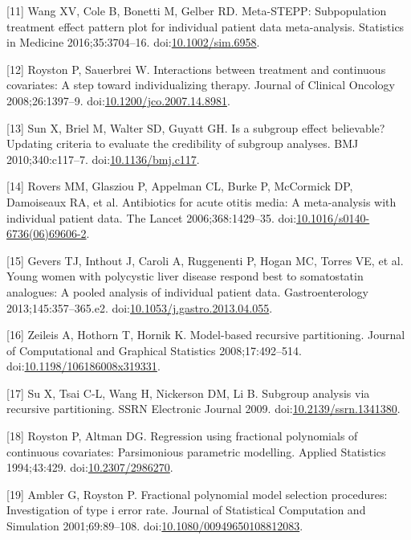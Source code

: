 \documentclass[14pt,]{article}
\begin{document}
\hypertarget{ref-Wang_2016}{}
{[}11{]} Wang XV, Cole B, Bonetti M, Gelber RD. Meta-STEPP:
Subpopulation treatment effect pattern plot for individual patient data
meta-analysis. Statistics in Medicine 2016;35:3704--16.
doi:\href{https://doi.org/10.1002/sim.6958}{10.1002/sim.6958}.

\hypertarget{ref-Royston_2008}{}
{[}12{]} Royston P, Sauerbrei W. Interactions between treatment and
continuous covariates: A step toward individualizing therapy. Journal of
Clinical Oncology 2008;26:1397--9.
doi:\href{https://doi.org/10.1200/jco.2007.14.8981}{10.1200/jco.2007.14.8981}.

\hypertarget{ref-Sun_2010}{}
{[}13{]} Sun X, Briel M, Walter SD, Guyatt GH. Is a subgroup effect
believable? Updating criteria to evaluate the credibility of subgroup
analyses. BMJ 2010;340:c117--7.
doi:\href{https://doi.org/10.1136/bmj.c117}{10.1136/bmj.c117}.

\hypertarget{ref-Rovers_2006}{}
{[}14{]} Rovers MM, Glasziou P, Appelman CL, Burke P, McCormick DP,
Damoiseaux RA, et al. Antibiotics for acute otitis media: A
meta-analysis with individual patient data. The Lancet
2006;368:1429--35.
doi:\href{https://doi.org/10.1016/s0140-6736(06)69606-2}{10.1016/s0140-6736(06)69606-2}.

\hypertarget{ref-Gevers_2013}{}
{[}15{]} Gevers TJ, Inthout J, Caroli A, Ruggenenti P, Hogan MC, Torres
VE, et al. Young women with polycystic liver disease respond best to
somatostatin analogues: A pooled analysis of individual patient data.
Gastroenterology 2013;145:357--365.e2.
doi:\href{https://doi.org/10.1053/j.gastro.2013.04.055}{10.1053/j.gastro.2013.04.055}.

\hypertarget{ref-Zeileis_2008}{}
{[}16{]} Zeileis A, Hothorn T, Hornik K. Model-based recursive
partitioning. Journal of Computational and Graphical Statistics
2008;17:492--514.
doi:\href{https://doi.org/10.1198/106186008x319331}{10.1198/106186008x319331}.

\hypertarget{ref-Su_2009}{}
{[}17{]} Su X, Tsai C-L, Wang H, Nickerson DM, Li B. Subgroup analysis
via recursive partitioning. SSRN Electronic Journal 2009.
doi:\href{https://doi.org/10.2139/ssrn.1341380}{10.2139/ssrn.1341380}.

\hypertarget{ref-Royston_1994}{}
{[}18{]} Royston P, Altman DG. Regression using fractional polynomials
of continuous covariates: Parsimonious parametric modelling. Applied
Statistics 1994;43:429.
doi:\href{https://doi.org/10.2307/2986270}{10.2307/2986270}.

\hypertarget{ref-Ambler_2001}{}
{[}19{]} Ambler G, Royston P. Fractional polynomial model selection
procedures: Investigation of type i error rate. Journal of Statistical
Computation and Simulation 2001;69:89--108.
doi:\href{https://doi.org/10.1080/00949650108812083}{10.1080/00949650108812083}.
\end{document}
